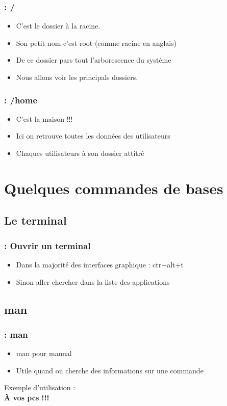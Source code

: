 \documentclass{beamer}
\newenvironment{slide}[1]{
  \begin{frame}[environment=slide]
    \frametitle{\textbf{\insertsection}  : #1}}
{\end{frame}}
\begin{document}
\begin{slide}{/}
  \begin{itemize}
  \item C'est le dossier à la racine.
  \item Son petit nom c'est root (comme racine en anglais)
  \item De ce dossier pars tout l'arborescence du systéme
  \item Nous allons voir les principals dossiers.
  \end{itemize}
\end{slide}

\begin{slide}{/home}
  \begin{itemize}
  \item C'est la maison !!!
  \item Ici on retrouve toutes les données des utilisateurs
  \item Chaques utilisateurs à son dossier attitré
  \end{itemize}
\end{slide}

\section{Quelques commandes de bases}

\subsection{Le terminal}
\begin{slide}{Ouvrir un terminal}
  \begin{itemize}
  \item Dans la majorité des interfaces graphique : ctr+alt+t
  \item Sinon aller chercher dans la liste des applications
  \end{itemize}
\end{slide}

\subsection{man}

\begin{slide}{man}
  \begin{itemize}
  \item man pour manual
  \item Utile quand on cherche des informations sur une commande
  \end{itemize}
  \begin{center}
    \large{Exemple d'utilisation :\\
      \textbf{À vos pcs !!!}}
  \end{center}
\end{slide}
\end{document}
